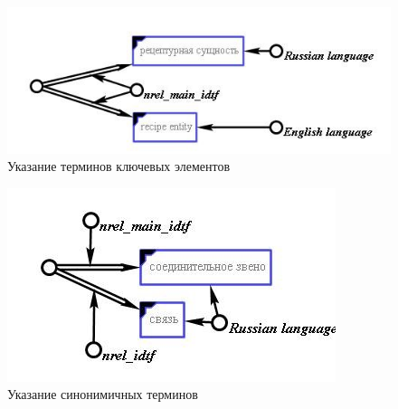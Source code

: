 \begin{figure}[H]
    \centering
    \includegraphics{images/chapter_3/рецептурная_сущность_главная_scg.jpg}
    \caption{Указание терминов ключевых элементов}
    \label{fig:recipe_entity_main_scg}
\end{figure}

\begin{figure}[H]
    \centering
    \includegraphics{images/chapter_3/рецептурная_сущность_синоним_scg.jpg}
    \caption{Указание синонимичных терминов}
    \label{fig:recipe_entity_synonym_scg}
\end{figure}

